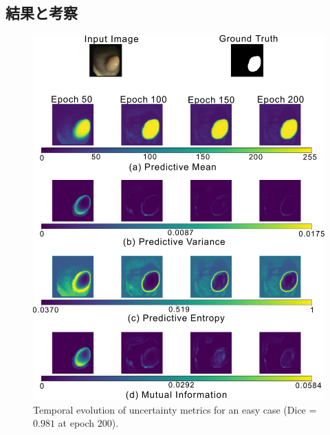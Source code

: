 \documentclass[10pt, a4paper, twocolumn]{jarticle}
\begin{document}
\subsection{結果と考察}

\begin{figure}[t] %
  \begin{center}
    \includegraphics[width=\hsize]{figure/fold5_file144_uncertainty_evolution.pdf}
    \caption{Temporal evolution of uncertainty metrics for an easy case (Dice = $0.981$ at epoch $200$).}
    \label{fold5_file144}
  \end{center}
\end{figure}
\end{document}
